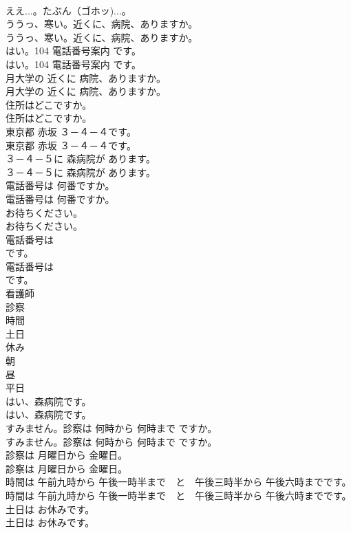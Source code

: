 \documentclass[8pt]{extreport}
\begin{document}
\begin{CJK}{UTF8}{min}
\\	ええ...。たぶん（ゴホッ)...。 
\\	ううっ、寒い。近くに、病院、ありますか。	
\\	ううっ、寒い。近くに、病院、ありますか。 
\\	はい。104 電話番号案内 です。	
\\	はい。104 電話番号案内 です。 
\\	月大学の 近くに 病院、ありますか。	
\\	月大学の 近くに 病院、ありますか。 
\\	住所はどこですか。	
\\	住所はどこですか。 
\\	東京都 赤坂 ３－４－４です。	
\\	東京都 赤坂 ３－４－４です。 
\\	３－４－５に 森病院が あります。	
\\	３－４－５に 森病院が あります。 
\\	電話番号は 何番ですか。	
\\	電話番号は 何番ですか。 
\\	お待ちください。	
\\	お待ちください。 
\\	電話番号は　
\\	です。	
\\	電話番号は　
\\	です。　 
\\	看護師
\\	診察
\\	時間
\\	土日
\\	休み
\\	朝
\\	昼
\\	平日
\\	はい、森病院です。	
\\	はい、森病院です。 
\\	すみません。診察は 何時から 何時まで ですか。	
\\	すみません。診察は 何時から 何時まで ですか。 
\\	診察は 月曜日から 金曜日。	
\\	診察は 月曜日から 金曜日。 
\\	時間は 午前九時から 午後一時半まで　と　午後三時半から 午後六時までです。	
\\	時間は 午前九時から 午後一時半まで　と　午後三時半から 午後六時までです。 
\\	土日は お休みです。	
\\	土日は お休みです。 

\end{CJK}
\end{document}

